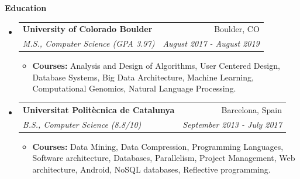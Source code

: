 \documentclass[letterpaper,10pt]{article}
\makeatletter
\newcommand{\resitem}[1]{\item #1 \vspace{-2pt}}
\newcommand{\resheading}[1]{{\large \colorbox{mygrey}{\begin{minipage}{\textwidth}{\textbf{#1 \vphantom{p\^{E}}}}\end{minipage}}}}
\newcommand{\ressubheading}[4]{
\begin{tabular*}{7.0in}{l@{\extracolsep{\fill}}r}
		\textbf{#1} & \textit{#4} \\
\end{tabular*}\vspace{-6pt}}
\newcommand{\ressubheadinged}[4]{
\begin{tabular*}{7.0in}{l@{\extracolsep{\fill}}r}
		\textbf{#1} & #2 \\
		\textit{#3} & \textit{#4}\\
\end{tabular*}\vspace{-6pt}}
\makeatother
\begin{document}
\begin{itemize}
	\end{itemize}
\break
\resheading{Education}
	\begin{itemize}
		\item
			\ressubheadinged{University of Colorado Boulder}{Boulder, CO}{M.S., Computer Science (GPA 3.97)}{August 2017 - August 2019}
			\begin{itemize}
				\resitem{\textbf{Courses:} Analysis and Design of Algorithms, User Centered Design, Database Systems, Big Data Architecture, Machine Learning, Computational Genomics, Natural Language Processing.}
			\end{itemize}

		\item
			\ressubheadinged{Universitat Polit\`ecnica de Catalunya}{Barcelona, Spain}{B.S., Computer Science (8.8/10)}{September 2013 - July 2017}
			\begin{itemize}
				\resitem{\textbf{Courses:} Data Mining, Data Compression, Programming Languages, Software architecture, Databases, Parallelism, Project Management, Web architecture, Android, NoSQL databases, Reflective programming.}
			\end{itemize}

	\end{itemize}
\end{document}
